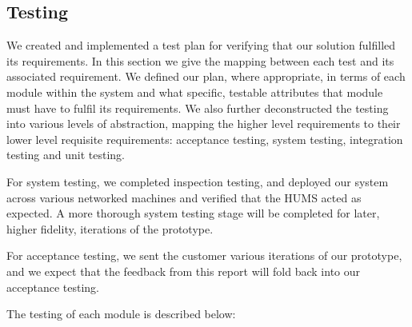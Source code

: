 \documentclass[10pt,a4paper]{article}
\begin{document}
\subsection{Testing} 
We created and implemented a test plan for verifying that our solution fulfilled its
requirements. In this section we give the mapping between each
test and its associated requirement. We
defined our plan, where appropriate, in terms of each module within
the system and what specific, testable attributes that module must
have to fulfil its requirements. We also further deconstructed the
testing into various levels of abstraction, mapping the higher level
requirements to their lower level requisite requirements: acceptance
testing, system testing, integration testing and unit
testing.


For system testing, we completed inspection testing, and deployed our system across various networked machines and verified that the HUMS acted as expected. A more thorough system testing stage will be completed for later, higher fidelity, iterations of the prototype.

For acceptance testing, we sent the customer various iterations of our prototype, and we expect that the feedback from this report will fold back into our acceptance testing.

The testing of each module is described below:
\end{document}
